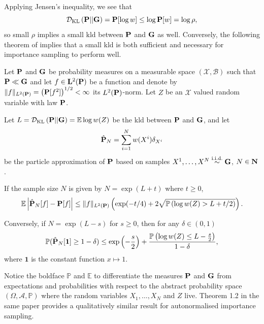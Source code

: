 Applying Jensen's inequality, we see that
$$
\Dkl{\P}{\G} = \P [\log w] \leq \log \P[w] = \log\rho,
$$
so small $\rho$ implies a small \gls{kld} between $\P$ and $\G$ as well. Conversely, the following theorem of \citeauthor{Chatterjee2018Sample} implies that a small \gls{kld} is both sufficient and necessary for importance sampling to perform well.
\begin{theorem}
    \label{thm:chatterje2018Thm1}
     Let $\P$ and $\G$ be probability measures on a measurable space $(\mathcal X, \mathcal B)$ such that $\P \ll \G$ and let $f \in \mathbf L^2(\P)$ be a function and denote by $\lVert f \rVert_{L^{2}(\P)} = \left( \P [f^{2}] \right)^{1 / 2} < 
     \infty$ its $L^{2}(\P)$-norm. Let $Z$ be an $\mathcal X$ valued random variable with law $\P$. 
     
     Let $L = \Dkl{\P}{\G} = \mathbb E \log w(Z)$ be the \gls{kld} between $\P$ and $\G$, and let $$\hat \P_N = \sum_{i = 1}^N w(X^i) \delta_{X^i}$$ be the particle approximation of $\P$  based on samples $X^1, \dots, X^N\iid \G$, $N \in \N$. 
     
     If the sample size $N$ is given by $N = \exp\left( L + t \right)$ where $t \geq 0$,
     \begin{align} 
        \label{eq:chatterje-upper-bound}
        \mathbb E \left\lvert \hat \P_N[f] - \P [f] \right\rvert \leq \lVert f \rVert_{L^2(\P)} \left(\exp(-t / 4) + 2 \sqrt{\mathbb P \left( \log w(Z) > L + t / 2 \right)}\right). 
    \end{align}

    Conversely, if $N = \exp \left( L - s \right)$ for $s \geq 0$, then for any $\delta \in (0,1)$ 
    \begin{align}
        \label{eq:chatterje-lower-bound}
    \mathbb P (\hat \P_{N}[ \mathbf 1 ] \geq 1 - \delta) \leq \exp \left( -\frac{s}{2} \right) + \frac{\mathbb P \left( \log w(Z) \leq L -\frac{s}{2} \right)}{ 1- \delta},
    \end{align}
    where $\mathbf 1$ is the constant function $x \mapsto 1$.

\end{theorem}
Notice the boldface $\mathbb P$ and $\mathbb E$ to differentiate the measures $\P$ and $\G$ from expectations and probabilities with respect to the abstract probability space $\left( \Omega, \mathcal A, \mathbb P \right)$ where the random variables $X_{1}, \dots, X_{N}$ and $Z$ live.
Theorem 1.2 in the same paper provides a qualitatively similar result for autonormalised importance sampling.

